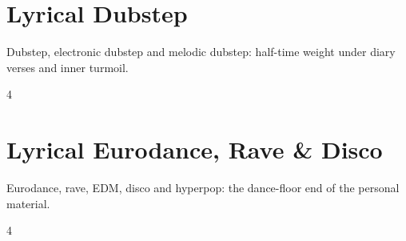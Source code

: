 \documentclass[a4paper,landscape]{memoir}
\begin{document}
\chapter{Lyrical Dubstep}
Dubstep, electronic dubstep and melodic dubstep: half-time weight under diary verses and inner turmoil.
\clearpage\begin{multicols*}{4}
\end{multicols*}

\chapter{Lyrical Eurodance, Rave \& Disco}
Eurodance, rave, EDM, disco and hyperpop: the dance-floor end of the personal material.
\clearpage\begin{multicols*}{4}
\end{multicols*}
\end{document}
